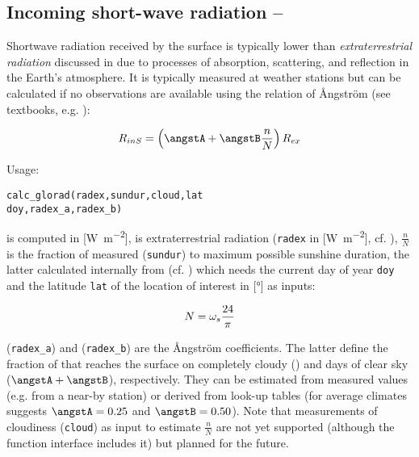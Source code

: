 \subsection{Incoming short-wave radiation -- \radShortwaveIn} \label{sec:meteo:radshort}
Shortwave radiation received by the surface is typically lower than \emph{extraterrestrial radiation} discussed in  due to processes of absorption, scattering, and reflection in the Earth's atmosphere. It is typically measured at weather stations but can be calculated if no observations are available using the relation of {\AA}ngström (see textbooks, e.g. \citet{Maidment1993}):

\begin{equation}\label{eqn:meteo:radshort}
\radShortwaveIn{} = \left( \angstA + \angstB \frac{n}{N} \right) \radExtraterr{}
\end{equation}

\noindent
Usage:
\begin{verbatim}
calc_glorad(radex,sundur,cloud,lat
doy,radex_a,radex_b)
\end{verbatim}

\radShortwaveIn{} is computed in [\si{\watt\per\metre\squared}], \radExtraterr{} is extraterrestrial radiation (\verb!radex! in [\si{\watt\per\metre\squared}], cf. ), $\frac{n}{N}$ is the fraction of measured (\verb!sundur!) to maximum possible sunshine duration, the latter calculated internally from \dayTimeFac{} (cf. ) which needs the current day of year \verb!doy! and the latitude \verb!lat! of the location of interest in [\si{\degree}] as inputs:

\begin{equation}\label{eqn:meteo:radshort:sundur}
N = \omega_{s}{} \frac{24}{\pi}
\end{equation}

\angstA{} (\verb!radex_a!) and \angstB{} (\verb!radex_b!) are the {\AA}ngström coefficients. The latter define the fraction of \radExtraterr{} that reaches the surface on completely cloudy (\angstA{}) and days of clear sky ($\angstA + \angstB$), respectively. They can be estimated from measured values (e.g. from a near-by station) or derived from look-up tables (for average climates \citet{Maidment1993} suggests $\angstA = \num{0.25}$ and $\angstB = \num{0.50}$). Note that measurements of cloudiness (\verb!cloud!) as input to estimate $\frac{n}{N}$ are not yet supported (although the function interface includes it) but planned for the future.

